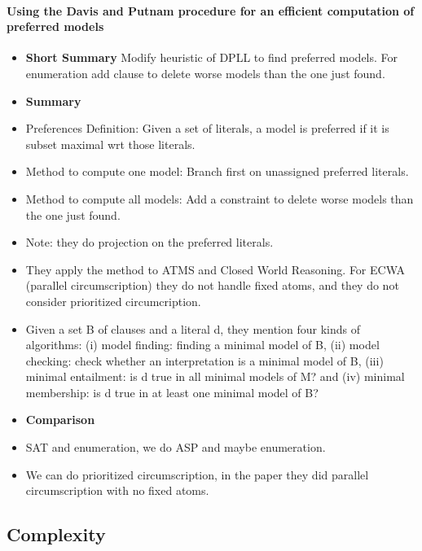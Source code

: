 \paragraph{Using the Davis and Putnam procedure for an efficient computation of preferred models \cite{cacacale96a}}
\begin{itemize}
	\item \textbf{Short Summary}
				Modify heuristic of DPLL to find preferred models. For enumeration add clause to delete worse models than the one just found.
	\item \textbf{Summary}
	\item Preferences Definition: Given a set of literals, a model is preferred if it is subset maximal wrt those literals.
	\item Method to compute one model: Branch first on unassigned preferred literals.
	\item Method to compute all models: Add a constraint to delete worse models than the one just found.
	\item Note: they do projection on the preferred literals.
	\item They apply the method to ATMS and Closed World Reasoning. 
				For ECWA (parallel circumscription) they do not handle fixed atoms, and they do not consider prioritized circumcription.
	\item Given a set B of clauses and a literal d, they mention four kinds of algorithms: (i) model finding: finding a minimal model of B, 
				(ii) model checking: check whether an interpretation is a minimal model of B,
				(iii) minimal entailment: is d true in all minimal models of M?
				and (iv) minimal membership: is d true in at least one minimal model of B?
	\item \textbf{Comparison}
	\item SAT and enumeration, we do ASP and maybe enumeration.
	\item We can do prioritized circumscription, in the paper they did parallel circumscription with no fixed atoms.
\end{itemize}


\subsection{Complexity}	

